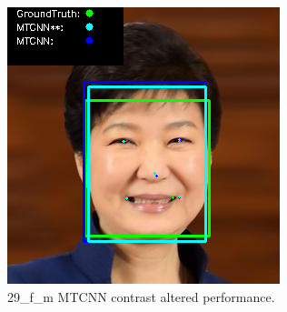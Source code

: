 \documentclass{l4proj}
\begin{document}
\begin{appendices}
\begin{figure}[h!]
  \centering
  \begin{minipage}{0.49\textwidth}
    \centering
     \includegraphics[width=\textwidth]{images/mtcnn/29.png}
    \caption{29\_f\_m MTCNN contrast altered performance.}
    \label{whoopi_result}
  \end{minipage}
    \hfill
    \begin{minipage}{0.49\textwidth}
    \centering

\end{minipage}
\end{figure}
\end{appendices}
\end{document}
